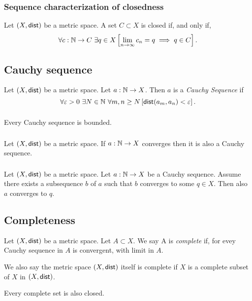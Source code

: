 \subsubsection*{Sequence characterization of closedness}
\uprop Let $(X, \mathsf{dist})$ be a metric space. A set $C \subset X$ is closed if,
and only if,
\[
    \forall c : \mathbb{N} \to C\ \exists q \in X \left[ \lim_{n \to \infty} c_n = q \implies q \in C \right].
\]

\subsection{Cauchy sequence}
\udef Let $(X, \mathsf{dist})$ be a metric space. Let $a : \mathbb{N} \to X$. Then $a$ is a
\emph{Cauchy Sequence} if
\[
    \forall \varepsilon > 0\ \exists N \in \mathbb{N}\ \forall m,n \geq N \left[ \mathsf{dist}(a_m, a_n) < \varepsilon \right].
\]

\subsubsection*{}
\uprop Every Cauchy sequence is bounded.

\subsubsection*{}
\uprop Let $(X, \mathsf{dist})$ be a metric space. If $a : \mathbb{N} \to X$ converges then
it is also a Cauchy sequence.

\subsubsection*{}
\uprop Let $(X, \mathsf{dist})$ be a metric space.
Let $a : \mathbb{N} \to X$ be a Cauchy sequence. Assume there exists a subsequence $b$
of $a$ such that $b$ converges to some $q \in X$. Then also $a$ converges to $q$.

\subsection{Completeness}
\udef Let $(X, \mathsf{dist})$ be a metric space. Let $A \subset X$. We say A is
\emph{complete} if, for evey Cauchy sequence in $A$ is convergent,
with limit in $A$.

\par
We also say the metric space $(X, \mathsf{dist})$ itself is complete if $X$ is a complete
subset of $X$ in $(X, \mathsf{dist})$.

\par
Every complete set is also closed.


